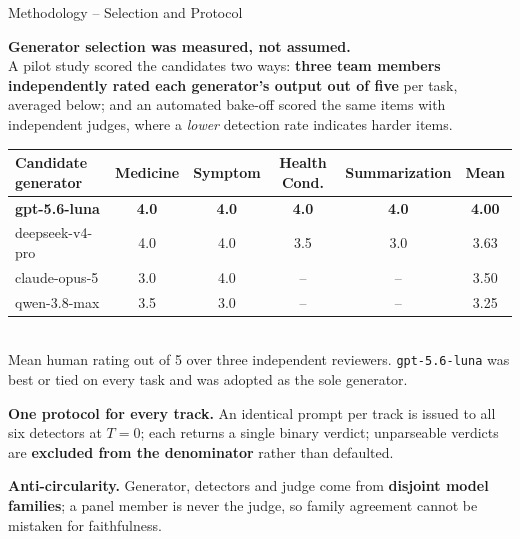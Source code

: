 \documentclass[aspectratio=169,11pt]{beamer}
\begin{document}
\begin{frame}[shrink=12]{Methodology \;--\; Selection and Protocol}
\vspace{-1mm}
{\footnotesize
\textbf{Generator selection was measured, not assumed.}\\[1.5mm]
A pilot study scored the candidates two ways: \textbf{three team members independently rated each generator's output out of five} per task, averaged below; and an automated bake-off scored the same items with independent judges, where a \emph{lower} detection rate indicates harder items.
\vspace{2mm}
\begin{center}{\scriptsize
\begin{tabular}{@{}lccccc@{}}
\toprule
\textbf{Candidate generator} & \textbf{Medicine} & \textbf{Symptom} & \textbf{Health Cond.} & \textbf{Summarization} & \textbf{Mean}\\
\midrule
\textbf{gpt-5.6-luna} & \textbf{4.0} & \textbf{4.0} & \textbf{4.0} & \textbf{4.0} & \textbf{4.00}\\
deepseek-v4-pro & 4.0 & 4.0 & 3.5 & 3.0 & 3.63\\
claude-opus-5 & 3.0 & 4.0 & -- & -- & 3.50\\
qwen-3.8-max & 3.5 & 3.0 & -- & -- & 3.25\\
\bottomrule
\end{tabular}}\\[1mm]
{\scriptsize\color{soft}Mean human rating out of 5 over three independent reviewers. \texttt{gpt-5.6-luna} was best or tied on every task and was adopted as the sole generator.}
\end{center}
\vspace{1.5mm}
\textbf{One protocol for every track.}\;
An identical prompt per track is issued to all six detectors at $T=0$; each returns a single binary verdict; unparseable verdicts are \textbf{excluded from the denominator} rather than defaulted.
\vspace{1mm}

\textbf{Anti-circularity.}\;
Generator, detectors and judge come from \textbf{disjoint model families}; a panel member is never the judge, so family agreement cannot be mistaken for faithfulness.
}
\end{frame}
\end{document}
